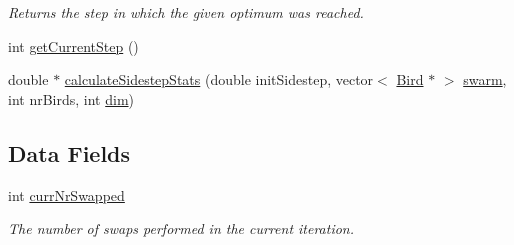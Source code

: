 \begin{CompactItemize}
\begin{CompactList}\small\item\em Returns the step in which the given optimum was reached. \item\end{CompactList}\item 
int \hyperlink{classPsoStatistics_7f0b1661dfa4627c0e2e15020ab6b83e}{getCurrentStep} ()
\item 
double $\ast$ \hyperlink{classPsoStatistics_ac6c4899720fbe600b094ad171839f9d}{calculateSidestepStats} (double initSidestep, vector$<$ \hyperlink{classBird}{Bird} $\ast$ $>$ \hyperlink{runpso_8cpp_d109228d8e9242dab1ff75e8dc3e6787}{swarm}, int nrBirds, int \hyperlink{runpso_8cpp_70b5e28b5bc3d1b63a7435c5fe50b837}{dim})
\end{CompactItemize}
\subsection*{Data Fields}
\begin{CompactItemize}
\item 
int \hyperlink{classPsoStatistics_5044b5ce808f338d3b4048db731ccc2a}{currNrSwapped}
\begin{CompactList}\small\item\em The number of swaps performed in the current iteration. \item\end{CompactList}\end{CompactItemize}
